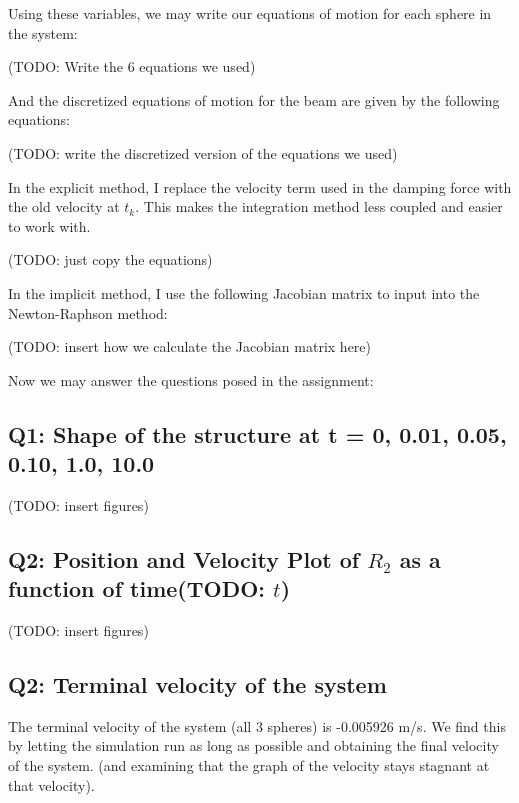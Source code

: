 \documentclass[letterpaper, 10 pt, conference]{ieeeconf}  %
\begin{document}
Using these variables, we may write our equations of motion for each sphere in the system:

(TODO: Write the 6 equations we used)

And the discretized equations of motion for the beam are given by the following equations:

(TODO: write the discretized version of the equations we used)

In the explicit method, I replace the velocity term used in the damping force with the old velocity at $t_k$. This makes the integration method less coupled and easier to work with.

(TODO: just copy the equations)

In the implicit method, I use the following Jacobian matrix to input into the Newton-Raphson method:

(TODO: insert how we calculate the Jacobian matrix here)

Now we may answer the questions posed in the assignment:

\subsection{Q1: Shape of the structure at t = {0, 0.01, 0.05, 0.10, 1.0, 10.0}}


(TODO: insert figures)

\subsection{Q2: Position and Velocity Plot of $R_2$  as a function of time(TODO: $t$)}

(TODO: insert figures)

\subsection{ Q2: Terminal velocity of the system}

The terminal velocity of the system (all 3 spheres) is -0.005926 m/s. We find this by letting the simulation run as long as possible and obtaining the final velocity of the system. (and examining that the graph of the velocity stays stagnant at that velocity).
\end{document}
